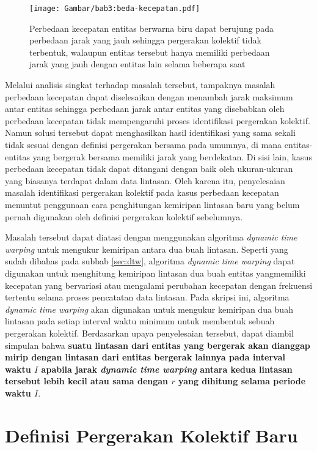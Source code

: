\begin{figure}[t]
    \centering
    \texttt{[image: Gambar/bab3:beda-kecepatan.pdf]}
    \caption{Perbedaan kecepatan entitas berwarna biru dapat berujung pada perbedaan jarak yang jauh sehingga pergerakan kolektif tidak terbentuk, walaupun entitas tersebut hanya memiliki perbedaan jarak yang jauh dengan entitas lain selama beberapa saat}
    \label{bab3:masalah-kecepatan}
\end{figure}
    
Melalui analisis singkat terhadap masalah tersebut, tampaknya masalah perbedaan kecepatan dapat diselesaikan dengan menambah jarak maksimum antar entitas sehingga perbedaan jarak antar entitas yang disebabkan oleh perbedaan kecepatan tidak mempengaruhi proses identifikasi pergerakan kolektif. Namun solusi tersebut dapat menghasilkan hasil identifikasi yang sama sekali tidak sesuai dengan definisi pergerakan bersama pada umumnya, di mana entitas-entitas yang bergerak bersama memiliki jarak yang berdekatan. Di sisi lain, kasus perbedaan kecepatan tidak dapat ditangani dengan baik oleh ukuran-ukuran yang biasanya terdapat dalam data lintasan. Oleh karena itu, penyelesaian masalah identifikasi pergerakan kolektif pada kasus perbedaan kecepatan menuntut penggunaan cara penghitungan kemiripan lintasan baru yang belum pernah digunakan oleh definisi pergerakan kolektif sebelumnya.

Masalah tersebut dapat diatasi dengan menggunakan algoritma \textit{dynamic time warping} untuk mengukur kemiripan antara dua buah lintasan. Seperti yang sudah dibahas pada subbab \ref{sec:dtw}, algoritma \textit{dynamic time warping} dapat digunakan untuk menghitung kemiripan lintasan dua buah entitas yangmemiliki kecepatan yang bervariasi atau mengalami perubahan kecepatan dengan frekuensi tertentu selama proses pencatatan data lintasan. Pada skripsi ini, algoritma \textit{dynamic time warping} akan digunakan untuk mengukur kemiripan dua buah lintasan pada setiap interval waktu minimum untuk membentuk sebuah pergerakan kolektif. Berdasarkan upaya penyelesaian tersebut, dapat diambil simpulan bahwa \textbf{suatu lintasan dari entitas yang bergerak akan dianggap mirip dengan lintasan dari entitas bergerak lainnya pada interval waktu $I$ apabila jarak \textit{dynamic time warping} antara kedua lintasan tersebut lebih kecil atau sama dengan $r$ yang dihitung selama periode waktu $I$}. 

\section{Definisi Pergerakan Kolektif Baru}


